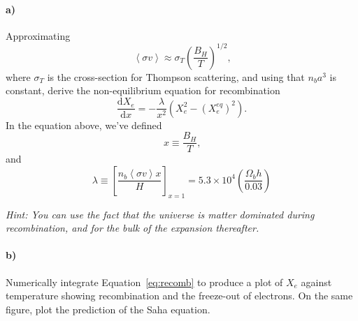 \documentclass[12pt]{article}
\newcommand\diff{\mathrm{d}}
\begin{document}
\paragraph{a)} Approximating
\begin{equation}
    \left<\sigma v\right> \approx \sigma_T \left(\frac{B_H}{T}\right)^{1/2} \text{,}
\end{equation}
where $\sigma_T$ is the cross-section for Thompson scattering, and using that
$n_b a^3$ is constant, derive the non-equilibrium equation for recombination
\begin{equation}
    \frac{\diff X_e}{\diff x} = -\frac{\lambda}{x^2}
    \left(X_e^2 - (X_e^{eq})^2\right) \text{.}
    \label{eq:recomb}
\end{equation}
In the equation above, we've defined
\begin{equation}
    x \equiv \frac{B_H}{T} \text{,}
\end{equation}
and
\begin{equation}
    \lambda \equiv \left[\frac{n_b\left<\sigma v\right> x}{H}\right]_{x=1}
    = 5.3 \times 10^4 \left(\frac{\Omega_b h}{0.03}\right)
\end{equation}

\emph{Hint: You can use the fact that the universe is matter dominated during recombination, and for the bulk of the expansion thereafter.}

\paragraph{b)} Numerically integrate Equation~\ref{eq:recomb} to produce a plot
of $X_e$ against temperature showing recombination and the freeze-out of
electrons. On the same figure, plot the prediction of the Saha equation.
\end{document}
